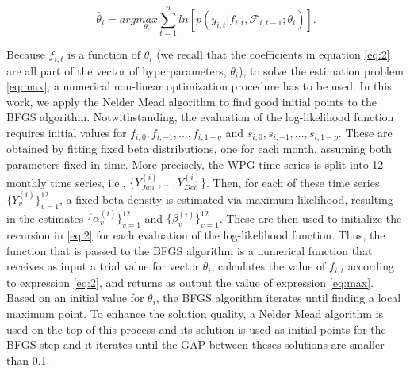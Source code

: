 \documentclass[a4paper]{IEEEtran}
\begin{document}
\begin{equation}
\hat{\theta}_i = arg\underset{\theta_i}{max} \sum_{t=1}^{n} ln[p(y_{i,t}|f_{i,t},\mathcal{F}_{i,t-1};\theta_i)].\label{eq:max}
\end{equation}


Because $f_{i,t}$ is a function of $\theta_i$ (we recall that the coefficients in equation \eqref{eq:2} are all part of the vector of hyperparameters, $\theta_i$), to solve the estimation problem \eqref{eq:max}, a numerical non-linear optimization procedure has to be used. In this work, we apply the Nelder Mead algorithm to find good initial points to the BFGS algorithm. Notwithstanding, the evaluation of the log-likelihood function requires initial values for $f_{i,0},f_{i,-1},...,f_{i,1-q}$ and $s_{i,0},s_{i,-1},...,s_{i,1-p}$. These  are obtained by fitting fixed beta distributions, one for each month, assuming both parameters fixed in time. More precisely, the WPG time series is split into 12 monthly time series, i.e., $\{Y_{Jan}^{(i)},..., Y_{Dec}^{(i)}\}$. Then, for each of these time series $\{Y_{v}^{(i)}\}_{v=1}^{12}$, a fixed beta density is estimated  via maximum likelihood, resulting in the estimates  $\{\alpha_{v}^{(i)}\}_{v=1}^{12}$ and $\{\beta_{v}^{(i)}\}_{v=1}^{12}$. These are then used to initialize the recursion in \eqref{eq:2} for each evaluation of the log-likelihood function. Thus, the function that is passed to the BFGS algorithm is a numerical function that receives as input a trial value for vector $\theta_i$, calculates the value of $f_{i,t}$ according to expression \eqref{eq:2}, and returns as output the value of expression \eqref{eq:max}. Based on an initial value for $\theta_i$, the BFGS algorithm iterates until finding a local maximum point. To enhance the solution quality, a Nelder Mead algorithm is used on the top of this process and its solution is used as initial points for the BFGS step and it iterates until the GAP between theses solutions are smaller than 0.1.
\end{document}
